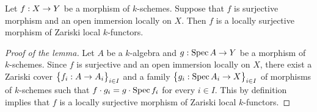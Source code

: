 \begin{lemma}\label{lemma:open_immersions_locally_on_domain_are_zariski_local_k_functors}
Let $f:X\rightarrow Y$ be a morphism of $k$-schemes. Suppose that $f$ is surjective morphism and an open immersion locally on $X$. Then $f$ is a locally surjective morphism of Zariski local $k$-functors. 
\end{lemma}
\begin{proof}[Proof of the lemma]
Let $A$ be a $k$-algebra and $g:\mathrm{Spec}\, A\rightarrow Y$ be a morphism of $k$-schemes. Since $f$ is surjective and an open immersion locally on $X$, there exist a Zariski cover $\big\{f_i:A\rightarrow A_i\big\}_{i\in I}$ and a family $\big\{g_i:\mathrm{Spec}\, A_i\rightarrow X\big\}_{i\in I}$ of morphisms of $k$-schemes such that $f\cdot g_i = g\cdot \mathrm{Spec}\, f_i$ for every $i\in I$. This by definition implies that $f$ is a locally surjective morphism of Zariski local $k$-functors.
\end{proof}

